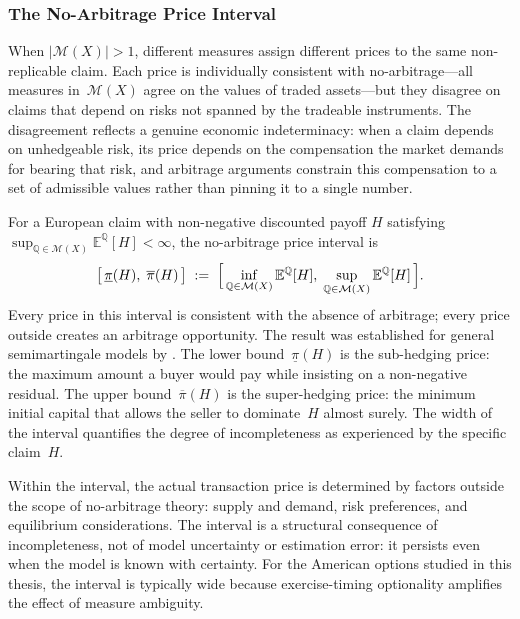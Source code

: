 \subsubsection{The No-Arbitrage Price Interval}
\label{sssec:price_interval}

When $|\mathcal{M}(X)| > 1$, different measures assign different prices to
the same non-replicable claim.  Each price is individually consistent with
no-arbitrage---all measures in~$\mathcal{M}(X)$ agree on the values of
traded assets---but they disagree on claims that depend on risks not
spanned by the tradeable instruments.  The disagreement reflects a genuine
economic indeterminacy: when a claim depends on unhedgeable risk, its
price depends on the compensation the market demands for bearing that
risk, and arbitrage arguments constrain this compensation to a set of
admissible values rather than pinning it to a single number.

For a European claim with non-negative discounted payoff $H$ satisfying
$\sup_{\mathbb{Q} \in \mathcal{M}(X)}
\mathbb{E}^{\mathbb{Q}}[H] < \infty$, the no-arbitrage price interval is
\begin{equation}
\label{eq:price_interval}
\bigl[\,\underline{\pi}(H),\;\overline{\pi}(H)\,\bigr]
\;:=\;
\Bigl[\,
  \inf_{\mathbb{Q} \in \mathcal{M}(X)}
    \mathbb{E}^{\mathbb{Q}}[H],\;
  \sup_{\mathbb{Q} \in \mathcal{M}(X)}
    \mathbb{E}^{\mathbb{Q}}[H]
\,\Bigr].
\end{equation}
Every price in this interval is consistent with the absence of
arbitrage; every price outside creates an arbitrage opportunity.  The
result was established for general semimartingale models by
\citet{ElKarouiQuenez1995}.  The lower bound~$\underline{\pi}(H)$ is
the sub-hedging price: the maximum amount a buyer would pay while
insisting on a non-negative residual.  The upper
bound~$\overline{\pi}(H)$ is the super-hedging price: the minimum
initial capital that allows the seller to dominate~$H$ almost surely.
The width of the interval quantifies the degree of incompleteness as
experienced by the specific claim~$H$.

Within the interval, the actual transaction price is determined by factors
outside the scope of no-arbitrage theory: supply and demand, risk
preferences, and equilibrium considerations.  The interval is a structural
consequence of incompleteness, not of model uncertainty or estimation
error: it persists even when the model is known with certainty.  For the
American options studied in this thesis, the interval is typically wide
because exercise-timing optionality amplifies the effect of measure
ambiguity.


